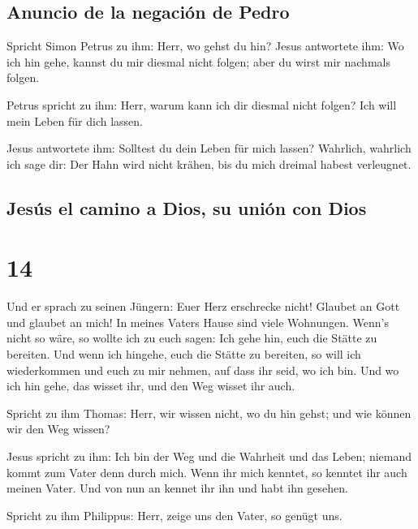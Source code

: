 \hypertarget{anuncio-de-la-negaciuxf3n-de-pedro}{%
\subsection{Anuncio de la negación de
Pedro}\label{anuncio-de-la-negaciuxf3n-de-pedro}}

 Spricht Simon Petrus zu ihm: Herr, wo gehst du hin?
Jesus antwortete ihm: Wo ich hin gehe, kannst du mir diesmal nicht
folgen; aber du wirst mir nachmals folgen.

 Petrus spricht zu ihm: Herr, warum kann ich dir diesmal
nicht folgen? Ich will mein Leben für dich lassen.

 Jesus antwortete ihm: Solltest du dein Leben für mich
lassen? Wahrlich, wahrlich ich sage dir: Der Hahn wird nicht krähen, bis
du mich dreimal habest verleugnet.

\hypertarget{jesuxfas-el-camino-a-dios-su-uniuxf3n-con-dios}{%
\subsection{Jesús el camino a Dios, su unión con
Dios}\label{jesuxfas-el-camino-a-dios-su-uniuxf3n-con-dios}}

\hypertarget{section-13}{%
\section{14}\label{section-13}}

 Und er sprach zu seinen Jüngern: Euer Herz erschrecke
nicht! Glaubet an Gott und glaubet an mich!  In meines
Vaters Hause sind viele Wohnungen. Wenn's nicht so wäre, so wollte ich
zu euch sagen: Ich gehe hin, euch die Stätte zu bereiten. 
Und wenn ich hingehe, euch die Stätte zu bereiten, so will ich
wiederkommen und euch zu mir nehmen, auf dass ihr seid, wo ich bin.
 Und wo ich hin gehe, das wisset ihr, und den Weg wisset
ihr auch.

 Spricht zu ihm Thomas: Herr, wir wissen nicht, wo du hin
gehst; und wie können wir den Weg wissen?

 Jesus spricht zu ihm: Ich bin der Weg und die Wahrheit
und das Leben; niemand kommt zum Vater denn durch mich. 
Wenn ihr mich kenntet, so kenntet ihr auch meinen Vater. Und von nun an
kennet ihr ihn und habt ihn gesehen.

 Spricht zu ihm Philippus: Herr, zeige uns den Vater, so
genügt uns.

